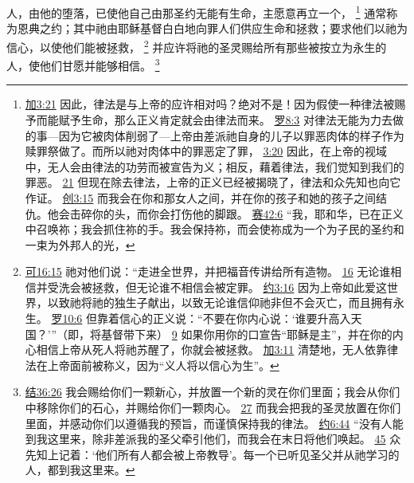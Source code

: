 \documentclass[12pt, a4paper, oneside]{ctexart}
\newcounter{parnum}[section]
\newcommand{\N}{%
   \noindent\refstepcounter{parnum}%
    \makebox[\parindent][l]{\textbf{\arabic{parnum}.}}}
\begin{document}
\N 人，由他的堕落，已使他自己由那圣约无能有生命，主愿意再立一个，
	\footnote {
		\href{https://biblehub.com/galatians/3-21.htm}{加3:21} 因此，律法是与上帝的应许相对吗？绝对不是！因为假使一种律法被赐予而能赋予生命，那么正义肯定就会由律法而来。
		\href{https://biblehub.com/romans/8-3.htm}{罗8:3} 对律法无能为力去做的事---因为它被肉体削弱了---上帝由差派祂自身的儿子以罪恶肉体的样子作为赎罪祭做了。而所以祂对肉体中的罪恶定了罪，
		\href{https://biblehub.com/romans/3-20.htm}{3:20} 因此，在上帝的视域中，无人会由律法的功劳而被宣告为义；相反，藉着律法，我们觉知到我们的罪恶。
		\href{https://biblehub.com/romans/3-21.htm}{21} 但现在除去律法，上帝的正义已经被揭晓了，律法和众先知也向它作证。
		\href{https://biblehub.com/genesis/3-15.htm}{创3:15} 而我会在你和那女人之间，并在你的孩子和她的孩子之间结仇。他会击碎你的头，而你会打伤他的脚跟。
		\href{https://biblehub.com/isaiah/42-6.htm}{赛42:6} “我，耶和华，已在正义中召唤祢；我会抓住祢的手。我会保持祢，而会使祢成为一个为子民的圣约和一束为外邦人的光，
	}
	通常称为恩典之约；其中祂由耶稣基督白白地向罪人们供应生命和拯救；要求他们以祂为信心，以使他们能被拯救，
	\footnote {
		\href{https://biblehub.com/mark/16-15.htm}{可16:15} 祂对他们说：“走进全世界，并把福音传讲给所有造物。
		\href{https://biblehub.com/mark/16-16.htm}{16} 无论谁相信并受洗会被拯救，但无论谁不相信会被定罪。
		\href{https://biblehub.com/john/3-16.htm}{约3:16} 因为上帝如此爱这世界，以致祂将祂的独生子献出，以致无论谁信仰祂非但不会灭亡，而且拥有永生。
		\href{https://biblehub.com/romans/10-6.htm}{罗10:6} 但靠着信心的正义说：“不要在你内心说：‘谁要升高入天国？’”（即，将基督带下来）
		\href{https://biblehub.com/romans/10-9.htm}{9} 如果你用你的口宣告“耶稣是主”，并在你的内心相信上帝从死人将祂苏醒了，你就会被拯救。
		\href{https://biblehub.com/galatians/3-11.htm}{加3:11} 清楚地，无人依靠律法在上帝面前被称义，因为“义人将以信心为生”。
	}
	并应许将祂的圣灵赐给所有那些被按立为永生的人，使他们甘愿并能够相信。
	\footnote {
		\href{https://biblehub.com/ezekiel/36-26.htm}{结36:26} 我会赐给你们一颗新心，并放置一个新的灵在你们里面；我会从你们中移除你们的石心，并赐给你们一颗肉心。
		\href{https://biblehub.com/ezekiel/36-27.htm}{27} 而我会把我的圣灵放置在你们里面，并感动你们以遵循我的预旨，而谨慎保持我的律法。
		\href{https://biblehub.com/john/6-44.htm}{约6:44} “没有人能到我这里来，除非差派我的圣父牵引他们，而我会在末日将他们唤起。
		\href{https://biblehub.com/john/6-45.htm}{45} 众先知上记着：‘他们所有人都会被上帝教导’。每一个已听见圣父并从祂学习的人，都到我这里来。
	}
\end{document}

